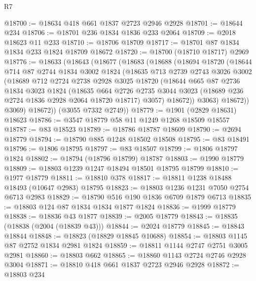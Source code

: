 \begin{lexlean}{R7}
\begin{coremodule}
@18700 := @18634 @418 @661 @1837 @2723 @2946 @2928
@18701 := @18644 @234
@18706 := @18701 @236 @1834 @1836 @233 @2064
@18709 := @2018 @18623 @11 @233
@18710 := @18706 @18709
@18717 := @18701 @87 @1834 @1834 @233 @1824 @18709 @18672
@18720 := @18700 (@18710 @18717) @2969
@18776 := @18633
    (@18643
      (@18677
        (@18683
          (@18688
            (@18694
              @18720
              (@18644
                @714
                @87
                @2744
                @1834
                @3002
                @1824
                (@18635
                  @713
                  @2739
                  @2743
                  @3026
                  @3002
                  (@18689
                    @712
                    @2724
                    @2738
                    @2928
                    @3025
                    @18720
                    (@18644
                      @665
                      @87
                      @2736
                      @1834
                      @3023
                      @1824
                      (@18635
                        @664
                        @2726
                        @2735
                        @3044
                        @3023
                        (@18689 @236 @2724 @1836 @2928 @2064 @18720 @18717)
                        @3057)
                      @18672))
                  @3063)
                @18672))
            @3069)
          @18672))
      (@3055 @7332 @2749))
@18779 := @1901 (@2829 @18631) @18623
@18786 := @3547 @18779 @58 @11 @1249 @1268 @18509 @18557
@18787 := @83 @18523
@18789 := @18786 @18787 @18609
@18790 := @2694 @18779
@18794 := @18790 @885 @1248 @18502 @18508
@18795 := @83 @18491
@18796 := @1806 @18795
@18797 := @83 @18507
@18799 := @1806 @18797 @1824
@18802 := @18794 (@18796 @18799) @18787
@18803 := @1990 @18779
@18809 := @18803 @1239 @1247 @18494 @18501 @18795 @18799
@18810 := @1977 @18779
@18811 := @18810 @378
@18817 := @18811 @1238 @18488 @18493 (@10647 @2983) @18795
@18823 := @18803 @1236 @1231 @7050 @2754 @6713 @2983
@18829 := @18790 @516 @190 @1836 @6709 @1879 @6713
@18835 := @18803 @124 @87 @1834 @1834 @1877 @1824
@18836 := @1999 @18779
@18838 := @18836 @43 @1877
@18839 := @2005 @18779
@18843 := @18835 (@18838 (@2004 (@18839 @43)))
@18844 := @2024 @18779
@18845 := @18843 @18844
@18848 := @18823 (@18829 @18845 @10688)
@18854 := @18803 @1145 @87 @2752 @1834 @2981 @1824
@18859 := @18811 @1144 @2747 @2751 @3005 @2981
@18860 := @18803 @662
@18865 := @18860 @1143 @2724 @2746 @2928 @3004
@18871 := @18810 @418 @661 @1837 @2723 @2946 @2928
@18872 := @18803 @234

\end{coremodule}
\end{lexlean}
